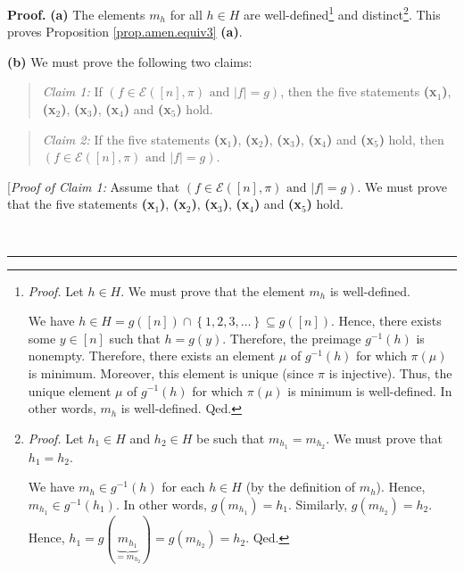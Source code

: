 \documentclass[numbers=enddot,12pt,final,onecolumn,notitlepage]{scrartcl}%
\theoremstyle{definition}
\newenvironment{statement}{\begin{quote}}{\end{quote}}
\newenvironment{proof}[1][Proof]{\noindent\textbf{#1.} }{\ \rule{0.5em}{0.5em}}
\newenvironment{verlong}{}{}
\begin{document}
\begin{verlong}
\begin{proof}
\textbf{(a)} The elements $m_{h}$ for all $h\in H$ are
well-defined\footnote{\textit{Proof.} Let $h\in H$. We must prove that the
element $m_{h}$ is well-defined.
\par
We have $h\in H=g\left(  \left[  n\right]  \right)  \cap\left\{
1,2,3,\ldots\right\}  \subseteq g\left(  \left[  n\right]  \right)  $. Hence,
there exists some $y\in\left[  n\right]  $ such that $h=g\left(  y\right)  $.
Therefore, the preimage $g^{-1}\left(  h\right)  $ is nonempty. Therefore,
there exists an element $\mu$ of $g^{-1}\left(  h\right)  $ for which
$\pi\left(  \mu\right)  $ is minimum. Moreover, this element is unique (since
$\pi$ is injective). Thus, the unique element $\mu$ of $g^{-1}\left(
h\right)  $ for which $\pi\left(  \mu\right)  $ is minimum is well-defined. In
other words, $m_{h}$ is well-defined. Qed.} and
distinct\footnote{\textit{Proof.} Let $h_{1}\in H$ and $h_{2}\in H$ be such
that $m_{h_{1}}=m_{h_{2}}$. We must prove that $h_{1}=h_{2}$.
\par
We have $m_{h}\in g^{-1}\left(  h\right)  $ for each $h\in H$ (by the
definition of $m_{h}$). Hence, $m_{h_{1}}\in g^{-1}\left(  h_{1}\right)  $. In
other words, $g\left(  m_{h_{1}}\right)  =h_{1}$. Similarly, $g\left(
m_{h_{2}}\right)  =h_{2}$. Hence, $h_{1}=g\left(  \underbrace{m_{h_{1}}%
}_{=m_{h_{2}}}\right)  =g\left(  m_{h_{2}}\right)  =h_{2}$. Qed.}. This proves
Proposition \ref{prop.amen.equiv3} \textbf{(a)}.

\textbf{(b)} We must prove the following two claims:

\begin{statement}
\textit{Claim 1:} If $\left(  f\in\mathcal{E}\left(  \left[  n\right]
,\pi\right)  \text{ and }\left\vert f\right\vert =g\right)  $, then the five
statements \textbf{(x}$_{1}$\textbf{)}, \textbf{(x}$_{2}$\textbf{)},
\textbf{(x}$_{3}$\textbf{)}, \textbf{(x}$_{4}$\textbf{)} and \textbf{(x}$_{5}%
$\textbf{)} hold.
\end{statement}

\begin{statement}
\textit{Claim 2:} If the five statements \textbf{(x}$_{1}$\textbf{)},
\textbf{(x}$_{2}$\textbf{)}, \textbf{(x}$_{3}$\textbf{)}, \textbf{(x}$_{4}%
$\textbf{)} and \textbf{(x}$_{5}$\textbf{)} hold, then $\left(  f\in
\mathcal{E}\left(  \left[  n\right]  ,\pi\right)  \text{ and }\left\vert
f\right\vert =g\right)  $.
\end{statement}

[\textit{Proof of Claim 1:} Assume that $\left(  f\in\mathcal{E}\left(
\left[  n\right]  ,\pi\right)  \text{ and }\left\vert f\right\vert =g\right)
$. We must prove that the five statements \textbf{(x}$_{1}$\textbf{)},
\textbf{(x}$_{2}$\textbf{)}, \textbf{(x}$_{3}$\textbf{)}, \textbf{(x}$_{4}%
$\textbf{)} and \textbf{(x}$_{5}$\textbf{)} hold.


\end{proof}
\end{verlong}
\end{document}
